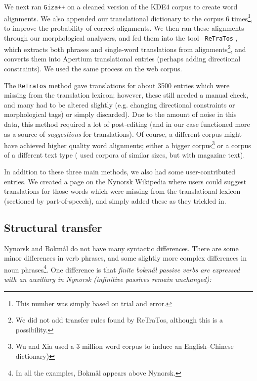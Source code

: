 \documentclass[11pt]{article}
\begin{document}
We next ran {\tt \small Giza++} \citep{och2003scv} on a cleaned
version of the KDE4 corpus to create word alignments. We also appended
our translational dictionary to the corpus 6 times\footnote{This
  number was simply based on trial and error.}, to improve the
probability of correct alignments. We then ran these alignments
through our morphological analysers, and fed them into the tool {\tt
  \small ReTraTos} \citep{caseli2006aib}, which extracts both phrases
and single-word translations from alignments\footnote{We did not add
  transfer rules found by ReTraTos, although this is a possibility.},
and converts them into Apertium translational entries (perhaps adding
directional constraints).  We used the same process on the web corpus.

The {\tt \small ReTraTos} method gave translations for about 3500
entries which were missing from the translation lexicon; however,
these still needed a manual check, and many had to be altered
slightly (e.g.  changing directional constraints or morphological
tags) or simply discarded). Due to the amount of noise in this data,
this method required a lot of post-editing (and in our case functioned
more as a source of \emph{suggestions} for translations). Of course, a
different corpus might have achieved higher quality word alignments;
either a bigger corpus\footnote{Wu and Xia \citep[1994,
in][p.~230]{caseli2006aib} used a 3 million word corpus to induce an
English–Chinese dictionary)} or a corpus of a different text type
(\citet{caseli2006aib} used corpora of similar sizes, but with
magazine text).

In addition to these three main methods, we also had some
user-contributed entries. We created a page on the Nynorsk Wikipedia
where users could suggest translations for those words which were
missing from the translational lexicon (sectioned by part-of-speech), and
simply added these as they trickled in.


\subsection{Structural transfer}
\label{sec:structural-transfer}
Nynorsk and Bokmål do not have many syntactic differences. There
are some minor differences in verb phrases, and some slightly more
complex differences in noun phrases\footnote{In all the examples,
  Bokmål appears above Nynorsk.}. One difference is that \emph{finite
  bokmål passive verbs are expressed with an auxiliary in Nynorsk
  (infinitive passives remain unchanged):}
\end{document}
